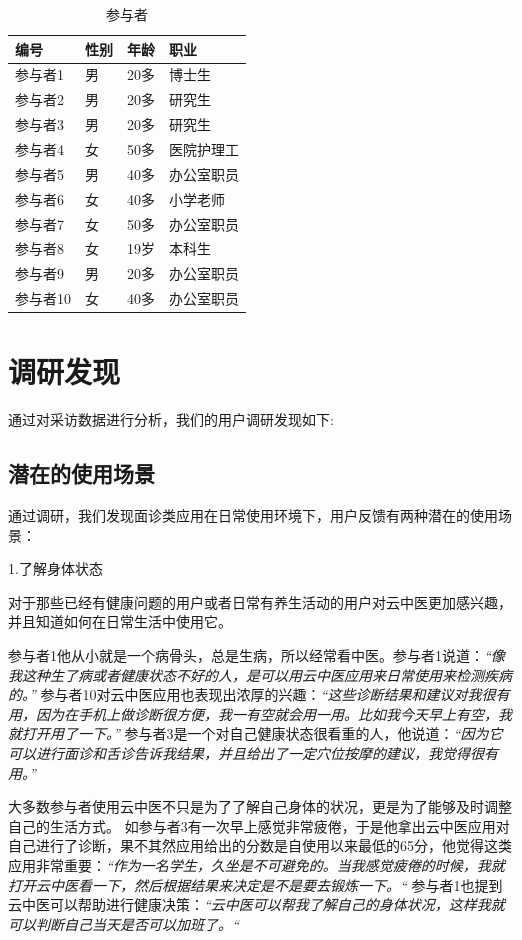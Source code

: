 \begin{table}
  
  \centering
  \label{tab:Participants}
  \begin{tabular}{llll}
        \toprule
        编号 &	性别 &	年龄 &	职业 \\
        \midrule
        参与者1 &	男 &	20多 &	博士生 \\
        参与者2 &	男 &	20多 &	研究生 \\
        参与者3 &	男 &	20多 &	研究生 \\
        参与者4 &	女 &	50多 &	医院护理工 \\
        参与者5 &	男 &	40多 &	办公室职员 \\
        参与者6 &	女 &	40多 &	小学老师 \\
        参与者7 &	女 &	50多 &	办公室职员 \\
        参与者8 &	女 &	19岁 &	本科生 \\
        参与者9 &	男 &	20多 &	办公室职员 \\
        参与者10 &	女 &	40多 &	办公室职员 \\
        \bottomrule
  \end{tabular}
  \caption{参与者}
\end{table}


\section{调研发现}
通过对采访数据进行分析，我们的用户调研发现如下:
\subsection{潜在的使用场景}
通过调研，我们发现面诊类应用在日常使用环境下，用户反馈有两种潜在的使用场景：

1.了解身体状态

对于那些已经有健康问题的用户或者日常有养生活动的用户对云中医更加感兴趣，并且知道如何在日常生活中使用它。

参与者1他从小就是一个病骨头，总是生病，所以经常看中医。参与者1说道：\textit{“像我这种生了病或者健康状态不好的人，是可以用云中医应用来日常使用来检测疾病的。”}
参与者10对云中医应用也表现出浓厚的兴趣：\textit{“这些诊断结果和建议对我很有用，因为在手机上做诊断很方便，我一有空就会用一用。比如我今天早上有空，我就打开用了一下。”}
参与者3是一个对自己健康状态很看重的人，他说道：\textit{“因为它可以进行面诊和舌诊告诉我结果，并且给出了一定穴位按摩的建议，我觉得很有用。”}

大多数参与者使用云中医不只是为了了解自己身体的状况，更是为了能够及时调整自己的生活方式。
如参与者3有一次早上感觉非常疲倦，于是他拿出云中医应用对自己进行了诊断，果不其然应用给出的分数是自使用以来最低的65分，他觉得这类应用非常重要：\textit{“作为一名学生，久坐是不可避免的。当我感觉疲倦的时候，我就打开云中医看一下，然后根据结果来决定是不是要去锻炼一下。“}
参与者1也提到云中医可以帮助进行健康决策：\textit{“云中医可以帮我了解自己的身体状况，这样我就可以判断自己当天是否可以加班了。“}


